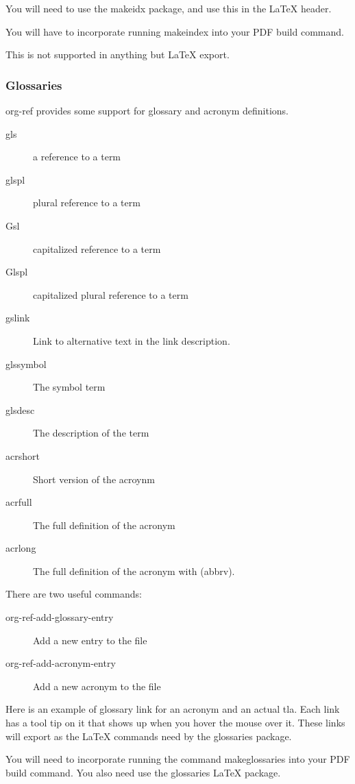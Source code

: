 \documentclass[11pt]{article}
\begin{document}
{You will need to use the makeidx package, and use this in the \LaTeX{} header.

You will have to incorporate running makeindex into your PDF build command.

This is not supported in anything but \LaTeX{} export.

\subsubsection{Glossaries}
\label{sec:orgheadline35}

org-ref provides some support for glossary and acronym definitions.
\begin{description}
\item[{gls}] a reference to a term
\item[{glspl}] plural reference to a term
\item[{Gsl}] capitalized reference to a term
\item[{Glspl}] capitalized plural reference to a term
\item[{gslink}] Link to alternative text in the link description.
\item[{glssymbol}] The symbol term
\item[{glsdesc}] The description of the term

\item[{acrshort}] Short version of the acroynm
\item[{acrfull}] The full definition of the acronym
\item[{acrlong}] The full definition of the acronym with (abbrv).
\end{description}

There are two useful commands:
\begin{description}
\item[{org-ref-add-glossary-entry}] Add a new entry to the file
\item[{org-ref-add-acronym-entry}] Add a new acronym to the file
\end{description}

Here is an example of glossary link for an \gls{acronym} and an actual \acrshort{tla}. Each link has a tool tip on it that shows up when you hover the mouse over it. These links will export as the \LaTeX{} commands need by the glossaries package.

You will need to incorporate running the command makeglossaries into your PDF build command. You also need use the glossaries \LaTeX{} package.

}
\end{document}
